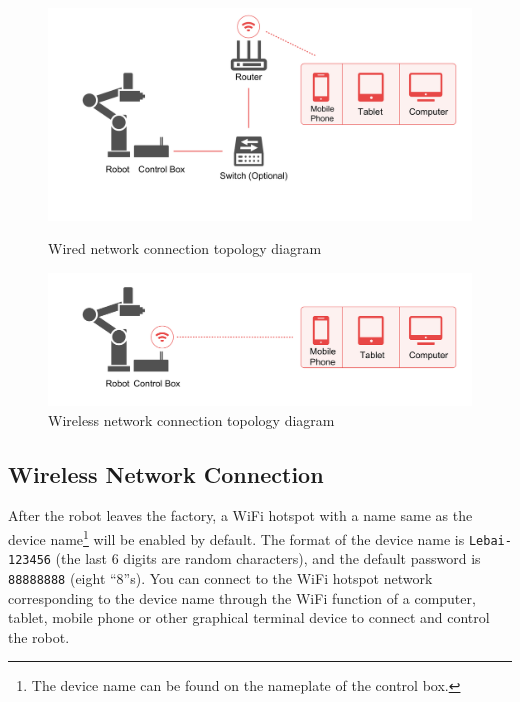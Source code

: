\begin{figure}[ht]
    \centering
    \includegraphics[width=\textwidth]{image/network-1.pdf}
    \caption{Wired network connection topology diagram}
	\label{fig:有线网络连接拓扑图}

    \includegraphics[width=\textwidth]{image/network-2.pdf}
    \caption{Wireless network connection topology diagram}
    \label{fig:无线网络连接拓扑图}
\end{figure}


\subsection{Wireless Network Connection}
After the robot leaves the factory, a Wi­Fi hotspot with a name same as the device name\footnote{The device name can be found on the nameplate of the control box.} will be enabled by default. The format of the device name is \verb|Lebai-123456| (the last 6 digits are random characters), and the default password is \verb|88888888| (eight ``8''s). You can connect to the Wi­Fi hotspot network corresponding to the device name through the Wi­Fi function of a computer, tablet, mobile phone or other graphical terminal device to connect and control the robot.


